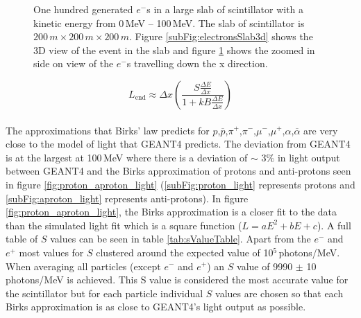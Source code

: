 \begin{figure}[!h]
\begin{subfigure}{.5\textwidth}
  \captionsetup{width=.9\linewidth}
  \caption{}
  \label{subFig:electronsSlabSideOn}
\end{subfigure}
\caption{One hundred generated $e^-$s in a large slab of scintillator with a kinetic energy from 0\,MeV -- 100\,MeV. The slab of scintillator is $200\,m \times 200\,m \times 200\,m$. Figure \ref{subFig:electronsSlab3d} shows the 3D view of the event in the slab and figure \ref{subFig:electronsSlabSideOn} shows the zoomed in side on view of the $e^-$s travelling down the x direction.}
\label{fig:electrons_viewed_in_slab}
\end{figure}

\begin{equation}
L_{\textrm{end}}\approx \Delta x \left(\frac{S\frac{\Delta E}{\Delta x}}{1 + kB \frac{\Delta E}{\Delta x}}\right) 
\label{equ:light_produced}
\end{equation}
\\The approximations that Birks' law predicts for $p$,$\overline{p}$,$\pi^+$,$\pi^-$,$\mu^-$,$\mu^+$,$\alpha$,$\overline{\alpha}$ are very close to the model of light that GEANT4 predicts. The deviation from GEANT4 is at the largest at 100\,MeV where there is a deviation of $\sim$ $3\%$ in light output between GEANT4 and the Birks approximation of protons and anti-protons seen in figure \ref{fig:proton_aproton_light} (\ref{subFig:proton_light} represents protons and \ref{subFig:aproton_light} represents anti-protons). In figure \ref{fig:proton_aproton_light}, the Birks approximation is a closer fit to the data than the simulated light fit which is a square function ($L = aE^2 + bE+ c$). A full table of $S$ values can be seen in table \ref{tab:sValueTable}. Apart from the $e^-$ and $e^+$ most values for $S$ clustered around the expected value of 10$^5$\,photons/MeV. When averaging all particles (except $e^-$ and $e^+$) an $S$ value of 9990 $\pm$ 10\,photons/MeV is achieved. This S value is considered the most accurate value for the scintillator but for each particle individual $S$ values are chosen so that each Birks approximation is as close to GEANT4's light output as possible.

